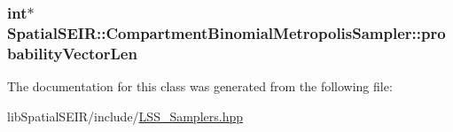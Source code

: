 \hypertarget{classSpatialSEIR_1_1CompartmentBinomialMetropolisSampler_adad677ace3b19726b377834fcd78b857}{
\subsubsection[{probability\-Vector\-Len}]{\setlength{\rightskip}{0pt plus 5cm}int$\ast$ Spatial\-S\-E\-I\-R\-::\-Compartment\-Binomial\-Metropolis\-Sampler\-::probability\-Vector\-Len}}\label{classSpatialSEIR_1_1CompartmentBinomialMetropolisSampler_adad677ace3b19726b377834fcd78b857}


The documentation for this class was generated from the following file\-:\begin{DoxyCompactItemize}
\item 
lib\-Spatial\-S\-E\-I\-R/include/\hyperlink{LSS__Samplers_8hpp}{L\-S\-S\-\_\-\-Samplers.\-hpp}\end{DoxyCompactItemize}
